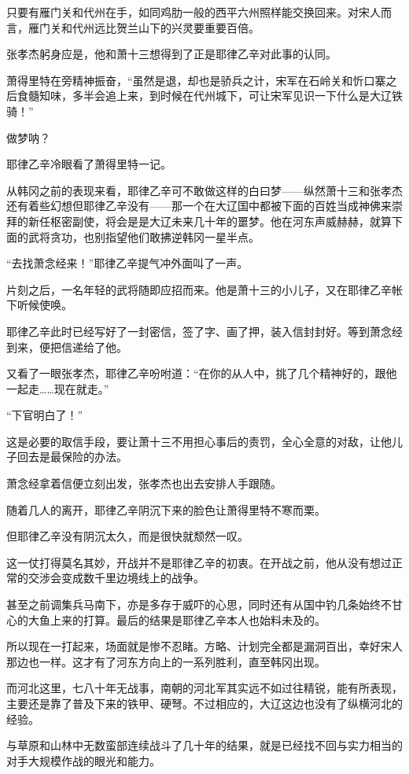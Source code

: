 只要有雁门关和代州在手，如同鸡肋一般的西平六州照样能交换回来。对宋人而言，雁门关和代州远比贺兰山下的兴灵要重要百倍。

张孝杰躬身应是，他和萧十三想得到了正是耶律乙辛对此事的认同。

萧得里特在旁精神振奋，“虽然是退，却也是骄兵之计，宋军在石岭关和忻口寨之后食髓知味，多半会追上来，到时候在代州城下，可让宋军见识一下什么是大辽铁骑！”

做梦呐？

耶律乙辛冷眼看了萧得里特一记。

从韩冈之前的表现来看，耶律乙辛可不敢做这样的白曰梦——纵然萧十三和张孝杰还有着些幻想但耶律乙辛没有——那一个在大辽国中都被下面的百姓当成神佛来崇拜的新任枢密副使，将会是是大辽未来几十年的噩梦。他在河东声威赫赫，就算下面的武将贪功，也别指望他们敢拂逆韩冈一星半点。

“去找萧念经来！”耶律乙辛提气冲外面叫了一声。

片刻之后，一名年轻的武将随即应招而来。他是萧十三的小儿子，又在耶律乙辛帐下听候使唤。

耶律乙辛此时已经写好了一封密信，签了字、画了押，装入信封封好。等到萧念经到来，便把信递给了他。

又看了一眼张孝杰，耶律乙辛吩咐道：“在你的从人中，挑了几个精神好的，跟他一起走……现在就走。”

“下官明白了！”

这是必要的取信手段，要让萧十三不用担心事后的责罚，全心全意的对敌，让他儿子回去是最保险的办法。

萧念经拿着信便立刻出发，张孝杰也出去安排人手跟随。

随着几人的离开，耶律乙辛阴沉下来的脸色让萧得里特不寒而栗。

但耶律乙辛没有阴沉太久，而是很快就颓然一叹。

这一仗打得莫名其妙，开战并不是耶律乙辛的初衷。在开战之前，他从没有想过正常的交涉会变成数千里边境线上的战争。

甚至之前调集兵马南下，亦是多存于威吓的心思，同时还有从国中钓几条始终不甘心的大鱼上来的打算。最后的结果是耶律乙辛本人也始料未及的。

所以现在一打起来，场面就是惨不忍睹。方略、计划完全都是漏洞百出，幸好宋人那边也一样。这才有了河东方向上的一系列胜利，直至韩冈出现。

而河北这里，七八十年无战事，南朝的河北军其实远不如过往精锐，能有所表现，主要还是靠了普及下来的铁甲、硬弩。不过相应的，大辽这边也没有了纵横河北的经验。

与草原和山林中无数蛮部连续战斗了几十年的结果，就是已经找不回与实力相当的对手大规模作战的眼光和能力。

